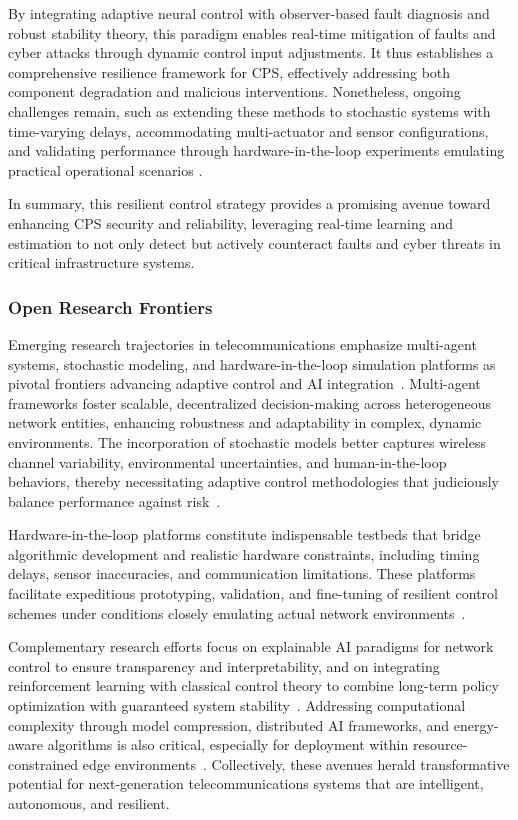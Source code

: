 \documentclass[sigconf]{acmart}
\begin{document}
By integrating adaptive neural control with observer-based fault diagnosis and robust stability theory, this paradigm enables real-time mitigation of faults and cyber attacks through dynamic control input adjustments. It thus establishes a comprehensive resilience framework for CPS, effectively addressing both component degradation and malicious interventions. Nonetheless, ongoing challenges remain, such as extending these methods to stochastic systems with time-varying delays, accommodating multi-actuator and sensor configurations, and validating performance through hardware-in-the-loop experiments emulating practical operational scenarios \cite{ref46}.

In summary, this resilient control strategy provides a promising avenue toward enhancing CPS security and reliability, leveraging real-time learning and estimation to not only detect but actively counteract faults and cyber threats in critical infrastructure systems.

\subsubsection{Open Research Frontiers}

Emerging research trajectories in telecommunications emphasize multi-agent systems, stochastic modeling, and hardware-in-the-loop simulation platforms as pivotal frontiers advancing adaptive control and AI integration~\cite{ref46}. Multi-agent frameworks foster scalable, decentralized decision-making across heterogeneous network entities, enhancing robustness and adaptability in complex, dynamic environments. The incorporation of stochastic models better captures wireless channel variability, environmental uncertainties, and human-in-the-loop behaviors, thereby necessitating adaptive control methodologies that judiciously balance performance against risk~\cite{ref46}.

Hardware-in-the-loop platforms constitute indispensable testbeds that bridge algorithmic development and realistic hardware constraints, including timing delays, sensor inaccuracies, and communication limitations. These platforms facilitate expeditious prototyping, validation, and fine-tuning of resilient control schemes under conditions closely emulating actual network environments~\cite{ref46}.

Complementary research efforts focus on explainable AI paradigms for network control to ensure transparency and interpretability, and on integrating reinforcement learning with classical control theory to combine long-term policy optimization with guaranteed system stability~\cite{ref50}. Addressing computational complexity through model compression, distributed AI frameworks, and energy-aware algorithms is also critical, especially for deployment within resource-constrained edge environments~\cite{ref49}. Collectively, these avenues herald transformative potential for next-generation telecommunications systems that are intelligent, autonomous, and resilient.
\end{document}

